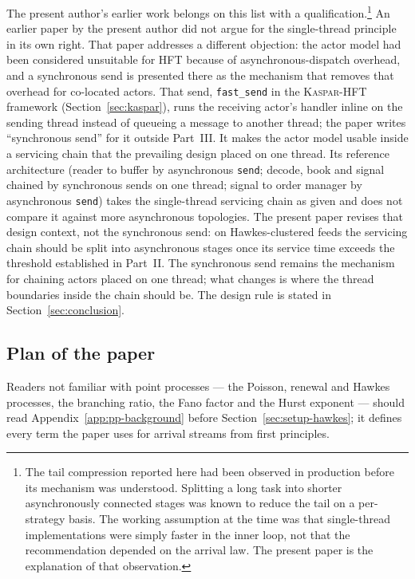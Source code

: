 \documentclass[11pt]{article}
\newcommand{\kasparhft}{\textsc{Kaspar-HFT}}
\begin{document}
The present author's earlier work belongs on this list with a qualification.\footnote{The tail compression reported here had been observed in production before its mechanism was understood. Splitting a long task into shorter asynchronously connected stages was known to reduce the tail on a per-strategy basis. The working assumption at the time was that single-thread implementations were simply faster in the inner loop, not that the recommendation depended on the arrival law. The present paper is the explanation of that
observation.} An earlier paper by the present author
\citep{mayeski_fastsend} did not argue for the single-thread principle in its own right.
That paper addresses a different objection: the actor model had been considered
unsuitable for HFT because of asynchronous-dispatch overhead, and a synchronous send is
presented there as the mechanism that removes that overhead for co-located actors. That
send, \texttt{fast\_send} in the \kasparhft{} framework (Section~\ref{sec:kaspar}), runs
the receiving actor's handler inline on the sending thread instead of queueing a message
to another thread; the paper writes ``synchronous send'' for it outside Part~III. It makes
the actor model usable inside a servicing chain that the prevailing design placed on one
thread. Its reference architecture (reader to buffer by asynchronous \texttt{send};
decode, book and signal chained by synchronous sends on one thread; signal to order
manager by asynchronous \texttt{send}) takes the single-thread servicing chain as given
and does not compare it against more asynchronous topologies. The present paper revises
that design context, not the synchronous send: on Hawkes-clustered feeds the
servicing chain should be split into asynchronous stages once its service time exceeds
the threshold established in Part~II. The synchronous send remains the mechanism for
chaining actors placed on one thread; what changes is where the thread boundaries inside
the chain should be. The design rule is stated in Section~\ref{sec:conclusion}.

\subsection{Plan of the paper}
\label{sec:intro-plan}

Readers not familiar with point processes --- the Poisson, renewal and Hawkes processes,
the branching ratio, the Fano factor and the Hurst exponent --- should read
Appendix~\ref{app:pp-background} before Section~\ref{sec:setup-hawkes}; it defines every
term the paper uses for arrival streams from first principles.
\end{document}
